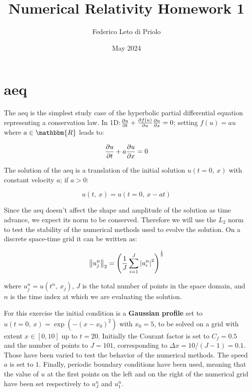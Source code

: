\documentclass[11pt, a4paper]{article}
\title{Numerical Relativity Homework 1}
\author{Federico Leto di Priolo}
\date{May 2024}
\begin{document}
\maketitle

\section{\acrfull{aeq}}

The \acrshort{aeq} is the simplest study case of the hyperbolic partial differential equation representing a conservation law. In 1D:\(\pdv{u}{t} + \pdv{f(u)}{u} \pdv{u}{x} = 0\); setting \(f(u) = au\) where \(a \in \mathbbm{R}\) leads to:

\begin{equation} \label{eq:adv_eq}
    \pdv{u}{t} + a \pdv{u}{x} = 0
\end{equation}

\noindent
The solution of the \acrshort{aeq} is a translation of the initial solution \(u(t = 0,\ x)\) with constant velocity \(a\); if \(a > 0\):

\begin{equation} \label{eq:adv_sol}
    u(t,\ x) = u(t = 0,\ x - at)
\end{equation}

Since the \acrshort{aeq} doesn't affect the shape and amplitude of the solution as time advance, we expect its norm to be conserved. Therefore we will use the \(L_2\) norm to test the stability of the numerical methods used to evolve the solution. On a discrete space-time grid it can be written as:

\begin{equation} \label{eq:l2_norm}
    \norm{u^n_j}_2 = \qty(\frac{1}{J} \sum_{i = 1}^J \abs{u^n_i}^2)^\frac{1}{2}
\end{equation}

\noindent
where \(u^n_j = u(t^n,\ x_j)\), \(J\) is the total number of points in the space domain, and \(n\) is the time index at which we are evaluating the solution.

For this exercise the initial condition is a \textbf{Gaussian profile} set to \(u(t = 0,\ x) = \exp(-(x - x_0)^2)\) with \(x_0 = 5\), to be solved on a grid with extent \(x \in [0, 10]\) up to \(t = 20\). Initially the Courant factor is set to \(C_f = 0.5\) and the number of points to \(J = 101\), corresponding to \(\Delta x = 10 / (J - 1) = 0.1\). Those have been varied to test the behavior of the numerical methods. The speed \(a\) is set to \(1\). Finally, periodic boundary conditions have been used, meaning that the value of \(u\) at the first points on the left and on the right of the numerical grid have been set respectively to \(u^n_J\) and \(u^n_1\).
\end{document}
